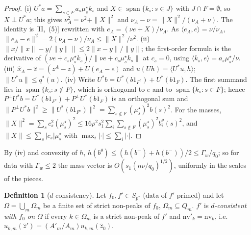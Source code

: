 \documentclass[10pt]{amsart}
\theoremstyle{definition}
\newtheorem{definition}[theorem]{Definition}
\theoremstyle{remark}
\newcommand{\spn}{\operatorname{span}}
\newcommand{\zh}{\hat z}
\newcommand{\ip}[2]{\langle #1,#2\rangle}
\begin{document}
\begin{proof}
(i) $U^*a=\sum_{s\in F}a_s\mu^\star_sk_s$ and $X\in\spn\{k_s:s\in J\}$ with
$J\cap F=\emptyset$, so $X\perp U^*a$; this gives $\nu_A^2=\nu^2+\|X\|^2$ and
$\nu_A-\nu=\|X\|^2/(\nu_A+\nu)$.  The identity is [II,~(5)] rewritten with
$e_A=(\nu e+X)/\nu_A$.  As $\ip{e_A}{e}=\nu/\nu_A$, $\|e_A-e\|^2=2(\nu_A-\nu)
/\nu_A\le\|X\|^2/\nu^2$.  (ii) $\|x/\|x\|-y/\|y\|\|\le2\|x-y\|/\|y\|$; the
first-order formula is the derivative of $(\nu e+c_s\mu^\star_sk_s)/\|\nu e+c_s
\mu^\star_sk_s\|$ at $c_s=0$, using $\ip{k_s}{e}=a_s\mu^\star_s/\nu$.  (iii)
$\hat x_A-\zh=(z^A-z)+U(e_A-e)$ and $u(Uh)=\ip{U^*u}{h}$; $\|U^*u\|\le q^*(u)$.
(iv) Write $U^*b=U^*(b1_{F^c})+U^*(b1_F)$.  The first summand lies in
$\spn\{k_s:s\notin F\}$, which is orthogonal to $e$ and to
$\spn\{k_s:s\in F\}$; hence $P^\perp U^*b=U^*(b1_{F^c})+P^\perp U^*(b1_F)$ is
an orthogonal sum and $\|P^\perp U^*b\|^2\ge\|U^*(b1_{F^c})\|^2=\sum_{s\notin F}
(\mu^\star_s)^2b(s)^2$.  For the masses, $\|X\|^2=\sum_s c_s^2(\mu^\star_s)^2\le
16\rho^2s_1^2\sum_i\sum_{s\notin F}(\mu^\star_s)^2b^\theta_i(s)^2$, and
$\|X\|\le\sum_s|c_s|\mu^\star_s$ with $\max_i|\cdot|\le\sum_i|\cdot|$.
\end{proof}

By (iv) and convexity of $h$, $h(b^\theta)\le(h(b^+)+h(b^-))/2\le
\Gamma_w/q_0$; so for data with $\Gamma_w\le2$ the mass vector is
$O(s_1(n\nu/q_0)^{1/2})$, uniformly in the scales of the pieces.

\begin{definition}[$d$-consistency]\label{def:III-dcons}
Let $f_0,f'\in S_{p^*}$ \textup{(}data of $f'$ primed\textup{)} and let
$\Omega=\bigcup_m\Omega_m$ be a finite set of strict non-peaks of $f_0$,
$\Omega_m\subseteq Q_m$.  $f'$ is \emph{$d$-consistent with $f_0$ on $\Omega$}
if every $k\in\Omega_m$ is a strict non-peak of $f'$ and
$\mathrm{nv}'_k=\mathrm{nv}_k$, i.e.\ $u_{k,m}(\zh')=(A'_m/A_m)u_{k,m}(\zh_0)$.
\end{definition}
\end{document}
